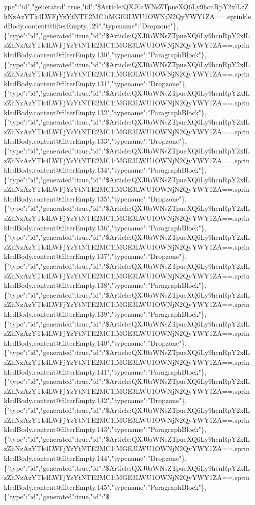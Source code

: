 ype":"id","generated":true,"id":"\$Article:QXJ0aWNsZTpueXQ6Ly9hcnRpY2xlLzZhNzAzYTk4LWFjYzYtNTE2MC1iMGE3LWU1OWNjN2QyYWY1ZA==.sprinkledBody.content@filterEmpty.129","typename":"Dropzone"\},\{"type":"id","generated":true,"id":"\$Article:QXJ0aWNsZTpueXQ6Ly9hcnRpY2xlLzZhNzAzYTk4LWFjYzYtNTE2MC1iMGE3LWU1OWNjN2QyYWY1ZA==.sprinkledBody.content@filterEmpty.130","typename":"ParagraphBlock"\},\{"type":"id","generated":true,"id":"\$Article:QXJ0aWNsZTpueXQ6Ly9hcnRpY2xlLzZhNzAzYTk4LWFjYzYtNTE2MC1iMGE3LWU1OWNjN2QyYWY1ZA==.sprinkledBody.content@filterEmpty.131","typename":"Dropzone"\},\{"type":"id","generated":true,"id":"\$Article:QXJ0aWNsZTpueXQ6Ly9hcnRpY2xlLzZhNzAzYTk4LWFjYzYtNTE2MC1iMGE3LWU1OWNjN2QyYWY1ZA==.sprinkledBody.content@filterEmpty.132","typename":"ParagraphBlock"\},\{"type":"id","generated":true,"id":"\$Article:QXJ0aWNsZTpueXQ6Ly9hcnRpY2xlLzZhNzAzYTk4LWFjYzYtNTE2MC1iMGE3LWU1OWNjN2QyYWY1ZA==.sprinkledBody.content@filterEmpty.133","typename":"Dropzone"\},\{"type":"id","generated":true,"id":"\$Article:QXJ0aWNsZTpueXQ6Ly9hcnRpY2xlLzZhNzAzYTk4LWFjYzYtNTE2MC1iMGE3LWU1OWNjN2QyYWY1ZA==.sprinkledBody.content@filterEmpty.134","typename":"ParagraphBlock"\},\{"type":"id","generated":true,"id":"\$Article:QXJ0aWNsZTpueXQ6Ly9hcnRpY2xlLzZhNzAzYTk4LWFjYzYtNTE2MC1iMGE3LWU1OWNjN2QyYWY1ZA==.sprinkledBody.content@filterEmpty.135","typename":"Dropzone"\},\{"type":"id","generated":true,"id":"\$Article:QXJ0aWNsZTpueXQ6Ly9hcnRpY2xlLzZhNzAzYTk4LWFjYzYtNTE2MC1iMGE3LWU1OWNjN2QyYWY1ZA==.sprinkledBody.content@filterEmpty.136","typename":"ParagraphBlock"\},\{"type":"id","generated":true,"id":"\$Article:QXJ0aWNsZTpueXQ6Ly9hcnRpY2xlLzZhNzAzYTk4LWFjYzYtNTE2MC1iMGE3LWU1OWNjN2QyYWY1ZA==.sprinkledBody.content@filterEmpty.137","typename":"Dropzone"\},\{"type":"id","generated":true,"id":"\$Article:QXJ0aWNsZTpueXQ6Ly9hcnRpY2xlLzZhNzAzYTk4LWFjYzYtNTE2MC1iMGE3LWU1OWNjN2QyYWY1ZA==.sprinkledBody.content@filterEmpty.138","typename":"ParagraphBlock"\},\{"type":"id","generated":true,"id":"\$Article:QXJ0aWNsZTpueXQ6Ly9hcnRpY2xlLzZhNzAzYTk4LWFjYzYtNTE2MC1iMGE3LWU1OWNjN2QyYWY1ZA==.sprinkledBody.content@filterEmpty.139","typename":"ParagraphBlock"\},\{"type":"id","generated":true,"id":"\$Article:QXJ0aWNsZTpueXQ6Ly9hcnRpY2xlLzZhNzAzYTk4LWFjYzYtNTE2MC1iMGE3LWU1OWNjN2QyYWY1ZA==.sprinkledBody.content@filterEmpty.140","typename":"Dropzone"\},\{"type":"id","generated":true,"id":"\$Article:QXJ0aWNsZTpueXQ6Ly9hcnRpY2xlLzZhNzAzYTk4LWFjYzYtNTE2MC1iMGE3LWU1OWNjN2QyYWY1ZA==.sprinkledBody.content@filterEmpty.141","typename":"ParagraphBlock"\},\{"type":"id","generated":true,"id":"\$Article:QXJ0aWNsZTpueXQ6Ly9hcnRpY2xlLzZhNzAzYTk4LWFjYzYtNTE2MC1iMGE3LWU1OWNjN2QyYWY1ZA==.sprinkledBody.content@filterEmpty.142","typename":"Dropzone"\},\{"type":"id","generated":true,"id":"\$Article:QXJ0aWNsZTpueXQ6Ly9hcnRpY2xlLzZhNzAzYTk4LWFjYzYtNTE2MC1iMGE3LWU1OWNjN2QyYWY1ZA==.sprinkledBody.content@filterEmpty.143","typename":"ParagraphBlock"\},\{"type":"id","generated":true,"id":"\$Article:QXJ0aWNsZTpueXQ6Ly9hcnRpY2xlLzZhNzAzYTk4LWFjYzYtNTE2MC1iMGE3LWU1OWNjN2QyYWY1ZA==.sprinkledBody.content@filterEmpty.144","typename":"Dropzone"\},\{"type":"id","generated":true,"id":"\$Article:QXJ0aWNsZTpueXQ6Ly9hcnRpY2xlLzZhNzAzYTk4LWFjYzYtNTE2MC1iMGE3LWU1OWNjN2QyYWY1ZA==.sprinkledBody.content@filterEmpty.145","typename":"ParagraphBlock"\},\{"type":"id","generated":true,"id":"\$